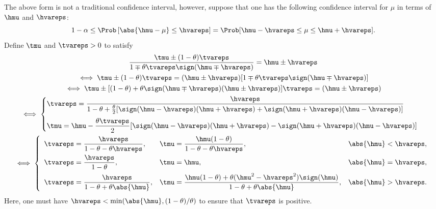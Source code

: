 \documentclass[graybox]{svmult}
\begin{document}
The above form is not a traditional confidence interval, however, suppose that one has the following confidence interval for $\mu$ in terms of $\hmu$ and $\hvareps$: 
\begin{equation} \label{relerrcritc}
1-\alpha \le \Prob\left[\abs{\hmu-\mu} \le \hvareps \right] = \Prob[\hmu-\hvareps \le \mu \le \hmu+\hvareps].
\end{equation}
Define $\tmu$ and $\tvareps>0$ to satisfy
\begin{gather}
\label{tmudef}
\frac{\tmu \pm (1-\theta) \tvareps}{1 \mp \theta \tvareps \sign(\hmu \mp \hvareps)} = \hmu \pm \hvareps \\
\nonumber
\iff \tmu \pm (1-\theta) \tvareps = (\hmu \pm \hvareps)[1 \mp \theta \tvareps \sign(\hmu \mp \hvareps)] \\
\nonumber
\iff \tmu \pm [(1-\theta) + \theta\sign(\hmu \mp \hvareps)(\hmu \pm \hvareps)]\tvareps = (\hmu \pm \hvareps) \\
\nonumber
\iff \begin{cases}
\displaystyle \tvareps= \frac{\hvareps}{1 -\theta +\frac{\theta}{2}[\sign(\hmu-\hvareps)(\hmu+\hvareps) + \sign(\hmu+\hvareps)(\hmu-\hvareps)]}\\[3ex]
\displaystyle \tmu= \hmu - \frac{\theta\tvareps}{2}[\sign(\hmu-\hvareps)(\hmu+\hvareps) - \sign(\hmu+\hvareps)(\hmu-\hvareps)] 
\end{cases}\\
\label{tepsdefb}
\iff 
\left\{
\begin{array}{lll}
\displaystyle \tvareps= \frac{\hvareps}{1 -\theta - \theta\hvareps}, & 
\displaystyle \tmu
= \frac{\hmu(1-\theta)}{1 -\theta - \theta\hvareps}, &
\abs{\hmu} < \hvareps, \\[2ex]
\displaystyle \tvareps= \frac{\hvareps}{1 -\theta}, & 
\tmu= \hmu, & 
\abs{\hmu} = \hvareps,\\[2ex]
\displaystyle \tvareps= \frac{\hvareps}{1 -\theta + \theta\abs{\hmu}}, & 
\displaystyle \tmu
= \frac{\hmu(1 -\theta) + \theta(\hmu^2-\hvareps^2)\sign(\hmu)}{1 -\theta + \theta\abs{\hmu}}, & 
\abs{\hmu} > \hvareps.
\end{array}
\right.
\end{gather}
Here, one must have $\hvareps<\min(\abs{\hmu},(1-\theta)/\theta)$ to ensure that $\tvareps$ is positive. 
\end{document}
